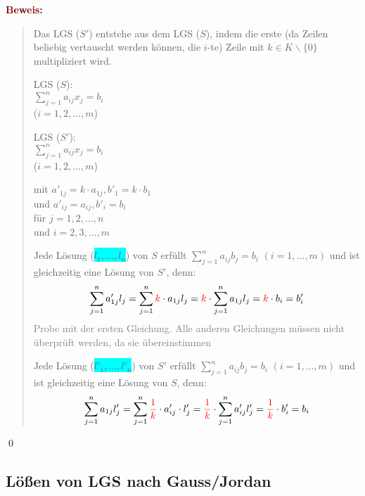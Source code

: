 \documentclass{article}
\newcommand{\mesp}{\phantom{\hspace{10px}}}
\newcommand{\red}[1]{\textcolor{red}{#1}}
\newcommand{\gray}[1]{\textcolor{gray}{#1}}
\newcommand{\maroon}[1]{\textcolor{maroon}{#1}}
\newcommand{\hcyan}[1]{\colorbox{cyan}{#1}}
\newcommand{\pr}[1]{\maroon{\textbf{Beweis: }}\begin{quote}#1\end{quote}\qed}
\begin{document}
\pr{
    Das LGS ($S'$) entstehe aus dem LGS ($S$), indem  die erste (da Zeilen beliebig vertauscht werden können, die $i$-te) Zeile mit $k \in K \backslash \{0\}$ multipliziert wird.
    
    \begin{minipage}{5cm}
        LGS ($S$):\\
        $\sum_{j=1}^{n}a_{ij}x_j=b_i$\\
        ($i = 1,2,\dots,m$)
        \vspace{40px}
    \end{minipage}
    \begin{minipage}{5cm}
        LGS ($S'$):\\
        $\sum_{j=1}^{n}a_{ij}x_j=b_i$\\
        ($i = 1,2,\dots,m$)

        mit $a'_{1j} = k \cdot a_{1j}, b'_1 = k \cdot b_1$\\
        und $a'_{ij} = a_{ij}, b'_i = b_i$\\
        \phantom{\mesp}für $j=1,2,\dots,n$\\
        \phantom{\mesp}und $i=2,3,\dots,m$
    \end{minipage}

    Jede Lösung (\hcyan{$l_1, ..., l_n$}) von $S$ erfüllt $\sum_{j=1}^{n}a_{ij}b_j=b_i$ $(i=1,\dots,m)$
    und ist gleichzeitig eine Lösung von $S'$, denn:
    \begin{equation*}
        \sum_{j=1}^{n}a'_{1j}l_j = \sum_{j=1}^{n}\red{k} \cdot a_{1j}l_j = \red{k} \cdot \sum_{j=1}^{n}a_{1j}l_j = \red{k} \cdot b_i = b'_i
    \end{equation*}
    \gray{Probe mit der ersten Gleichung. Alle anderen Gleichungen müssen nicht überprüft werden, da sie übereinstimmen}

    Jede Lösung (\hcyan{$l'_1, ..., l'_n$}) von $S'$ erfüllt $\sum_{j=1}^{n}a_{ij}b_j=b_i$ $(i=1,\dots,m)$
    und ist gleichzeitig eine Lösung von $S$, denn:
    \begin{equation*}
        \sum_{j=1}^{n}a_{1j}l'_j = \sum_{j=1}^{n} \red{\frac{1}{k}} \cdot a'_{ij}  \cdot l'_j = \red{\frac{1}{k}} \cdot \sum_{j=1}^{n}a'_{ij}l'_j = \red{\frac{1}{k}} \cdot b'_i = b_i
    \end{equation*}
}

\subsection{Lößen von LGS nach Gauss/Jordan}
\end{document}
